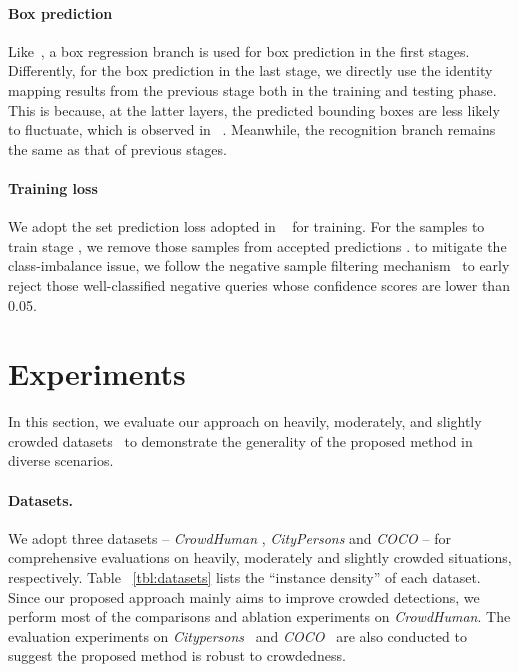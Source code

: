 \documentclass[final]{cvpr}
\begin{document}
\vspace{-0.6cm}
\paragraph{Box prediction}
Like~\cite{sun2020sparse}, a box regression branch is used for box prediction in the first  stages. Differently, for the box prediction in the last stage, we directly use the identity mapping results from the previous  stage both in the training and testing phase. This is because, at the latter layers, the predicted bounding boxes are less likely to fluctuate, which is observed in ~\cite{lin2020detr}. Meanwhile, the recognition branch remains the same as that of previous stages. 





\vspace{-0.6cm} 
\paragraph{Training loss}

We adopt the set prediction
loss adopted in ~\cite{sun2020sparse,zhu2021deformable} for training. For the samples to train stage , we remove those samples from accepted predictions . to mitigate the class-imbalance issue, we follow the negative sample filtering mechanism~\cite{zhang2018refinedet} to early reject those well-classified negative queries whose confidence scores are lower than 0.05.


\vspace{-0.3cm}
\section{Experiments}
\label{sec:exp}
In this section, we evaluate our approach on heavily, moderately, and slightly crowded datasets~\cite{shao2018crowdhuman,zhang2017citypersons,lin2014microsoft} to demonstrate the generality of the proposed method in diverse scenarios.
\vspace{-0.6cm} 
\paragraph{Datasets.}

We adopt three datasets -- \emph{CrowdHuman} \cite{shao2018crowdhuman}, \emph{CityPersons} \cite{zhang2017citypersons} and \emph{COCO} \cite{lin2014microsoft} -- for comprehensive evaluations on heavily, moderately and slightly crowded situations, respectively. Table ~\ref{tbl:datasets} lists the ``instance density'' of each dataset.  Since our proposed approach mainly aims to improve crowded detections, we perform most of the comparisons and ablation experiments on \emph{CrowdHuman}. The evaluation experiments on \emph{Citypersons}~\cite{zhang2017citypersons} and \emph{COCO}~\cite{lin2014microsoft} are also conducted to suggest the proposed method is robust to crowdedness.
\end{document}
